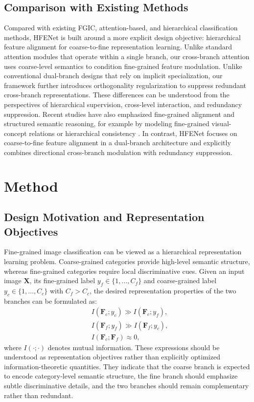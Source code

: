 \documentclass[pdflatex,iicol,sn-mathphys-num]{sn-jnl}
\theoremstyle{thmstyleone}%
\theoremstyle{thmstyletwo}%
\theoremstyle{thmstylethree}%
\begin{document}
\subsection{Comparison with Existing Methods}
Compared with existing FGIC, attention-based, and hierarchical classification methods, HFENet is built around a more explicit design objective: hierarchical feature alignment for coarse-to-fine representation learning. 
Unlike standard attention modules that operate within a single branch, our cross-branch attention uses coarse-level semantics to condition fine-grained feature modulation. 
Unlike conventional dual-branch designs that rely on implicit specialization, our framework further introduces orthogonality regularization to suppress redundant cross-branch representations. 
These differences can be understood from the perspectives of hierarchical supervision, cross-level interaction, and redundancy suppression.
Recent studies have also emphasized fine-grained alignment and structured semantic reasoning, for example by modeling fine-grained visual-concept relations or hierarchical consistency \cite{xie2025dotcbm,gao2025chbc}. 
In contrast, HFENet focuses on coarse-to-fine feature alignment in a dual-branch architecture and explicitly combines directional cross-branch modulation with redundancy suppression.

\section{Method}
\label{sec:method}

\subsection{Design Motivation and Representation Objectives}

Fine-grained image classification can be viewed as a hierarchical representation learning problem. Coarse-grained categories provide high-level semantic structure, whereas fine-grained categories require local discriminative cues. Given an input image $\mathbf{X}$, its fine-grained label $y_f \in \{1,\dots,C_f\}$ and coarse-grained label $y_c \in \{1,\dots,C_c\}$ with $C_f > C_c$, the desired representation properties of the two branches can be formulated as:
\begin{equation}
\begin{aligned}
&I(\mathbf{F}_c; y_c) \gg I(\mathbf{F}_c; y_f), \\
&I(\mathbf{F}_f; y_f) \gg I(\mathbf{F}_f; y_c), \\
&I(\mathbf{F}_c; \mathbf{F}_f) \approx 0,
\end{aligned}
\label{eq:information_constraints}
\end{equation}
where $I(\cdot;\cdot)$ denotes mutual information. These expressions should be understood as representation objectives rather than explicitly optimized information-theoretic quantities. They indicate that the coarse branch is expected to encode category-level semantic structure, the fine branch should emphasize subtle discriminative details, and the two branches should remain complementary rather than redundant.
\end{document}
